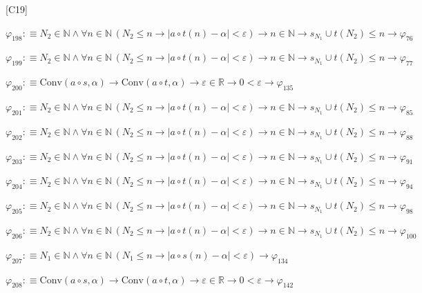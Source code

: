 \begin{fullproof}{[C19]}
\begin{abbrevlist}
\item $\varphi_{198} :\equiv N_{2} \in \mathbb{N} \land \forall n \in \mathbb{N}\,(N_{2} \leq n \to \lvert a \circ t(n) - \alpha \rvert < \varepsilon) \to n \in \mathbb{N} \to s_{N_{1}} \cup t(N_{2}) \leq n \to \varphi_{76}$
\item $\varphi_{199} :\equiv N_{2} \in \mathbb{N} \land \forall n \in \mathbb{N}\,(N_{2} \leq n \to \lvert a \circ t(n) - \alpha \rvert < \varepsilon) \to n \in \mathbb{N} \to s_{N_{1}} \cup t(N_{2}) \leq n \to \varphi_{77}$
\item $\varphi_{200} :\equiv \mathrm{Conv}(a \circ s,\alpha) \to \mathrm{Conv}(a \circ t,\alpha) \to \varepsilon \in \mathbb{R} \to 0 < \varepsilon \to \varphi_{135}$
\item $\varphi_{201} :\equiv N_{2} \in \mathbb{N} \land \forall n \in \mathbb{N}\,(N_{2} \leq n \to \lvert a \circ t(n) - \alpha \rvert < \varepsilon) \to n \in \mathbb{N} \to s_{N_{1}} \cup t(N_{2}) \leq n \to \varphi_{85}$
\item $\varphi_{202} :\equiv N_{2} \in \mathbb{N} \land \forall n \in \mathbb{N}\,(N_{2} \leq n \to \lvert a \circ t(n) - \alpha \rvert < \varepsilon) \to n \in \mathbb{N} \to s_{N_{1}} \cup t(N_{2}) \leq n \to \varphi_{88}$
\item $\varphi_{203} :\equiv N_{2} \in \mathbb{N} \land \forall n \in \mathbb{N}\,(N_{2} \leq n \to \lvert a \circ t(n) - \alpha \rvert < \varepsilon) \to n \in \mathbb{N} \to s_{N_{1}} \cup t(N_{2}) \leq n \to \varphi_{91}$
\item $\varphi_{204} :\equiv N_{2} \in \mathbb{N} \land \forall n \in \mathbb{N}\,(N_{2} \leq n \to \lvert a \circ t(n) - \alpha \rvert < \varepsilon) \to n \in \mathbb{N} \to s_{N_{1}} \cup t(N_{2}) \leq n \to \varphi_{94}$
\item $\varphi_{205} :\equiv N_{2} \in \mathbb{N} \land \forall n \in \mathbb{N}\,(N_{2} \leq n \to \lvert a \circ t(n) - \alpha \rvert < \varepsilon) \to n \in \mathbb{N} \to s_{N_{1}} \cup t(N_{2}) \leq n \to \varphi_{98}$
\item $\varphi_{206} :\equiv N_{2} \in \mathbb{N} \land \forall n \in \mathbb{N}\,(N_{2} \leq n \to \lvert a \circ t(n) - \alpha \rvert < \varepsilon) \to n \in \mathbb{N} \to s_{N_{1}} \cup t(N_{2}) \leq n \to \varphi_{100}$
\item $\varphi_{207} :\equiv N_{1} \in \mathbb{N} \land \forall n \in \mathbb{N}\,(N_{1} \leq n \to \lvert a \circ s(n) - \alpha \rvert < \varepsilon) \to \varphi_{134}$
\item $\varphi_{208} :\equiv \mathrm{Conv}(a \circ s,\alpha) \to \mathrm{Conv}(a \circ t,\alpha) \to \varepsilon \in \mathbb{R} \to 0 < \varepsilon \to \varphi_{142}$

\end{abbrevlist}
\end{fullproof}
